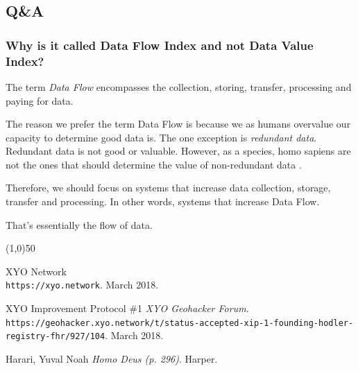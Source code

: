 \documentclass{article}
\begin{document}
\subsection{Q\&A}

\subsubsection{Why is it called Data Flow Index and not Data Value Index?}

The term \textit{Data Flow} encompasses the collection, storing, transfer, processing and paying for data. 

The reason we prefer the term Data Flow is because we as humans overvalue our capacity to determine good data is. The one exception is \textit{redundant data}. Redundant data is not good or valuable. However, as a species, homo sapiens are not the ones that should determine the value of non-redundant data \cite{homo-deus-narrative}. 

Therefore, we should focus on systems that increase data collection, storage, transfer and processing. In other words, systems that increase Data Flow. 



That’s essentially the flow of data. 


\begin{center}
\line(1,0){50}
\end{center}

\begin{thebibliography}{9}

XYO Network
\\\texttt{https://xyo.network}.
March 2018.

XYO Improvement Protocol \#1
\textit{XYO Geohacker Forum}.
\\\texttt{https://geohacker.xyo.network/t/status-accepted-xip-1-founding-hodler-registry-fhr/927/104}.
March 2018.

Harari, Yuval Noah
\textit{Homo Deus (p. 296)}. 
Harper.


\end{thebibliography}

\end{document}
